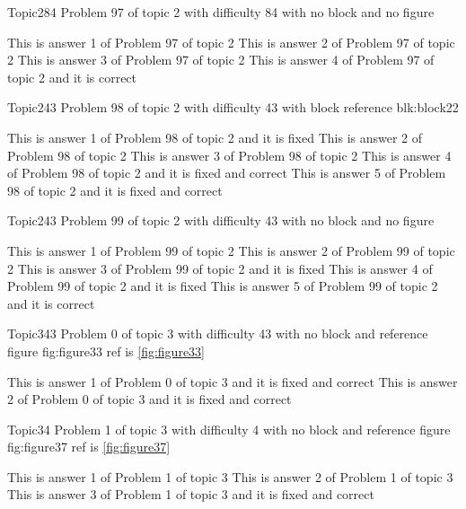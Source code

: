\documentclass[master]{exam}
\begin{document}
\begin{problem}{Topic2}{84}
	Problem 97 of topic 2 with difficulty 84 with no block and no figure
	\begin{answers}
		\answer This is answer 1 of Problem 97 of topic 2 
		\answer This is answer 2 of Problem 97 of topic 2 
		\answer This is answer 3 of Problem 97 of topic 2 
		\answer[correct] This is answer 4 of Problem 97 of topic 2 and it is correct
	\end{answers}
\end{problem}

\begin{problem}[requires=blk:block22]{Topic2}{43}
	Problem 98 of topic 2 with difficulty 43 with block reference blk:block22
	\begin{answers}
		\answer[fixed] This is answer 1 of Problem 98 of topic 2 and it is fixed
		\answer This is answer 2 of Problem 98 of topic 2 
		\answer This is answer 3 of Problem 98 of topic 2 
		 This is answer 4 of Problem 98 of topic 2 and it is fixed and correct
		 This is answer 5 of Problem 98 of topic 2 and it is fixed and correct
	\end{answers}
\end{problem}

\begin{problem}{Topic2}{43}
	Problem 99 of topic 2 with difficulty 43 with no block and no figure
	\begin{answers}
		\answer This is answer 1 of Problem 99 of topic 2 
		\answer This is answer 2 of Problem 99 of topic 2 
		\answer[fixed] This is answer 3 of Problem 99 of topic 2 and it is fixed
		\answer[fixed] This is answer 4 of Problem 99 of topic 2 and it is fixed
		\answer[correct] This is answer 5 of Problem 99 of topic 2 and it is correct
	\end{answers}
\end{problem}

\begin{problem}{Topic3}{43}
	Problem 0 of topic 3 with difficulty 43 with no block and reference figure fig:figure33 ref is \ref{fig:figure33}
	\begin{answers}
		 This is answer 1 of Problem 0 of topic 3 and it is fixed and correct
		 This is answer 2 of Problem 0 of topic 3 and it is fixed and correct
	\end{answers}
\end{problem}

\begin{problem}{Topic3}{4}
	Problem 1 of topic 3 with difficulty 4 with no block and reference figure fig:figure37 ref is \ref{fig:figure37}
	\begin{answers}
		\answer This is answer 1 of Problem 1 of topic 3 
		\answer This is answer 2 of Problem 1 of topic 3 
		 This is answer 3 of Problem 1 of topic 3 and it is fixed and correct
	\end{answers}
\end{problem}
\end{document}
